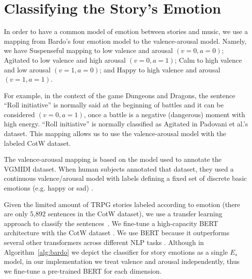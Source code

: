 \section{Classifying the Story's Emotion}

In order to have a common model of emotion between stories and music,
we use a mapping from Bardo's four emotion model to the valence-arousal model. Namely, we have Suspenseful mapping to low valence and arousal $(v = 0, a = 0)$; Agitated to low valence and high arousal $(v = 0, a = 1)$; Calm to high valence and low arousal $(v = 1, a = 0)$; and Happy to high valence and arousal $(v = 1, a = 1)$.

For example, in the context of the game Dungeons and Dragons, the sentence ``Roll initiative'' is normally said
at the beginning of battles and it can be considered $(v = 0, a = 1)$, once a battle
is a negative (dangerous) moment with high energy. ``Roll initiative'' is normally classified as Agitated in Padovani et al.'s dataset. This mapping allows us to use the valence-arousal model with the labeled CotW dataset.

The valence-arousal mapping is based on the model used to annotate the VGMIDI dataset. When human subjects annotated that dataset, they used a continuous valence/arousal model with labels defining a fixed set of discrete basic emotions (e.g. happy or sad) \cite{ferreira_2019}.




Given the limited amount of TRPG stories labeled according
to emotion (there are only 5,892 sentences in the CotW dataset), we use a transfer learning
approach to classify
the sentences~\cite{Radford2018}. We fine-tune a high-capacity BERT architecture with the CotW dataset  \cite{devlin2018bert}. We use BERT because it outperforms
several other transformers across different NLP tasks \cite{devlin2018bert}.
Although in Algorithm~\ref{alg:bardo} we depict the classifier for story emotions as a single $E_s$ model,
in our implementation we treat valence and arousal independently, thus we
fine-tune a pre-trained BERT for each dimension.

